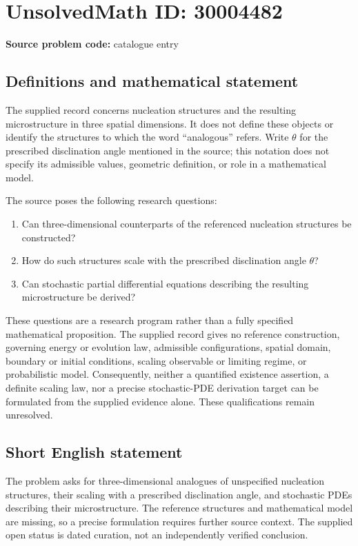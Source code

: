 \documentclass[11pt]{article}
\begin{document}
\section*{UnsolvedMath ID: 30004482}
\textbf{Source problem code:} catalogue entry
\subsection{Definitions and mathematical statement}
The supplied record concerns nucleation structures and the resulting microstructure in three spatial dimensions. It does not define these objects or identify the structures to which the word ``analogous'' refers. Write \(\theta\) for the prescribed disclination angle mentioned in the source; this notation does not specify its admissible values, geometric definition, or role in a mathematical model.

The source poses the following research questions:
\begin{enumerate}
\item Can three-dimensional counterparts of the referenced nucleation structures be constructed?
\item How do such structures scale with the prescribed disclination angle \(\theta\)?
\item Can stochastic partial differential equations describing the resulting microstructure be derived?
\end{enumerate}

These questions are a research program rather than a fully specified mathematical proposition. The supplied record gives no reference construction, governing energy or evolution law, admissible configurations, spatial domain, boundary or initial conditions, scaling observable or limiting regime, or probabilistic model. Consequently, neither a quantified existence assertion, a definite scaling law, nor a precise stochastic-PDE derivation target can be formulated from the supplied evidence alone. These qualifications remain unresolved.
\subsection{Short English statement}
The problem asks for three-dimensional analogues of unspecified nucleation structures, their scaling with a prescribed disclination angle, and stochastic PDEs describing their microstructure. The reference structures and mathematical model are missing, so a precise formulation requires further source context. The supplied open status is dated curation, not an independently verified conclusion.
\end{document}
